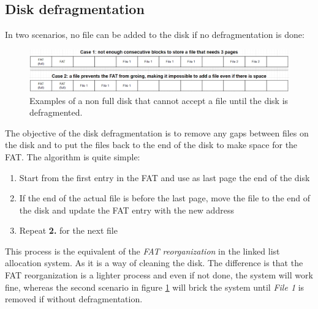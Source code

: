 \documentclass[10pt,a4paper]{ULBreport}
\begin{document}
\subsection{Disk defragmentation}
\label{sec:defragmentation}
In two scenarios, no file can be added to the disk if no defragmentation is done:
\begin{figure}[H]
    \centering
    \includegraphics[width=1\textwidth]{Reason_for_fragmentation_CA.png}
    \caption{Examples of a non full disk that cannot accept a file until the disk is defragmented. }
    \label{fig:defrag}
\end{figure}
The objective of the disk defragmentation is to remove any gaps between files on the disk and to put the files back to the end of the disk to make space for the FAT. The algorithm is quite simple:
\begin{enumerate}
    \item Start from the first entry in the FAT and use as last page the end of the disk
    \item If the end of the actual file is before the last page, move the file to the end of the disk and update the FAT entry with the new address
    \item Repeat \textbf{2.} for the next file
\end{enumerate}
This process is the equivalent of the \textit{FAT reorganization} in the linked list allocation system. As it is a way of cleaning the disk. The difference is that the FAT reorganization is a lighter process and even if not done, the system will work fine, whereas the second scenario in figure \ref{fig:defrag} will brick the system until \textit{File 1} is removed if without defragmentation. \\
\end{document}

